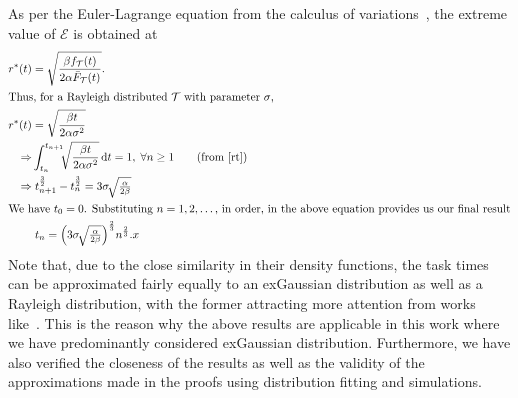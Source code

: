 As per the Euler-Lagrange equation from the calculus of variations~\cite{bellman1954dynamic,arfken2013calculus}, the extreme value of $\mathcal{E}$ is obtained at
\begin{alignat}{1}
    r^*(t)&=\sqrt{\dfrac{\beta f_\mathcal{T}(t)}{2\alpha\bar{F}_\mathcal{T}(t)}}.\\
    \intertext{Thus, for a Rayleigh distributed $\mathcal{T}$ with parameter $\sigma$,}
    r^*(t)&=\sqrt{\dfrac{\beta t}{2\alpha\sigma^2}}\\
    \Rightarrow &\int_{t_n}^{t_{n+1}}\!\!\!\sqrt{\dfrac{\beta t}{2\alpha\sigma^2}}\,\mathrm{d}t=1,\;\forall n\geq1\nonumber\tag{from \eqref{rt}}\\
    \Rightarrow &\;t_{n+1}^{\frac{3}{2}}-t_{n}^{\frac{3}{2}}=3\sigma\!\sqrt{\tfrac{\alpha}{2\beta}}\nonumber\\
    \intertext{We have $t_0=0$. Substituting $n=1,2,\dots$, in order, in the above equation provides us our final result}
    &\;t_n=\Big(3\sigma\!\sqrt{\tfrac{\alpha}{2\beta}}\Big)^{\frac{2}{3}}n^{\frac{2}{3}}\label{tnRayleigh}.
    x\end{alignat}
Note that, due to the close similarity in their density functions, the task times can be approximated fairly equally to an \gls{exGaussian} distribution as well as a Rayleigh distribution, with the former attracting more attention from works like~\cite{rohrer1994analysis,palmer2011what,marmolejo_ramos2022generalised}.
This is the reason why the above results are applicable in this work where we have predominantly considered \gls{exGaussian} distribution.
Furthermore, we have also verified the closeness of the results as well as the validity of the approximations made in the proofs using distribution fitting and simulations.

